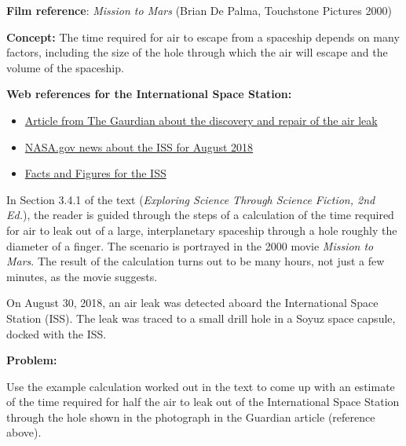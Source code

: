 \documentclass[12pt]{article}
\begin{document}
\vspace{1cm}
\noindent \textbf{Film reference}: \textit{Mission to Mars} (Brian De Palma,
Touchstone Pictures 2000)

\vspace{0.2cm}
\noindent \textbf{Concept:} The time required for air to escape from a spaceship
depends on many factors, including the size of the hole through which the air
will escape and the volume of the spaceship.

\vspace{0.2cm}
\noindent \textbf{Web references for the International Space Station:}
\begin{itemize}
    \item \href{https://www.theguardian.com/science/2018/sep/05/space-station-air-leak-someone-drilled-the-hole-say-russians}{Article from The Gaurdian about the discovery and repair of the air leak}
    \item\href{https://blogs.nasa.gov/spacestation/2018/08/}{NASA.gov news about the ISS for August 2018}
    \item \href{https://www.nasa.gov/international-space-station/space-station-facts-and-figures/}{Facts and Figures for the ISS}
\end{itemize}

\noindent In Section 3.4.1 of the text (\textit{Exploring Science Through Science Fiction, 2nd Ed.}), the reader is guided through the steps of a calculation of the time required for air to leak out of a large, interplanetary spaceship through a hole roughly the diameter of a finger. The scenario is portrayed in the 2000 movie \textit{Mission to Mars}. The result of the calculation turns out to be many hours, not just a few minutes, as the movie suggests.
\vspace{0.2cm}

\noindent On August 30, 2018, an air leak was detected aboard the International Space Station (ISS). The leak was traced to a small drill hole in a Soyuz space capsule, docked with the ISS.

\vspace{0.5cm}
\noindent \textbf{Problem:}

\noindent Use the example calculation worked out in the text to come up with an estimate of the time required for half the air to leak out of the International Space Station through the hole shown in the photograph in the Guardian article (reference above).
\end{document}
